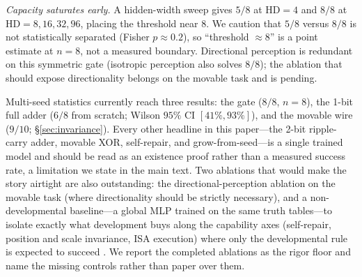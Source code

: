 \emph{Capacity saturates early.} A hidden-width sweep gives $5/8$ at HD$=4$ and $8/8$ at HD$=8,16,32,96$, placing the threshold near $8$. We caution that $5/8$ versus $8/8$ is not statistically separated (Fisher $p\approx0.2$), so ``threshold $\approx 8$'' is a point estimate at $n=8$, not a measured boundary. Directional perception is redundant on this symmetric gate (isotropic perception also solves $8/8$); the ablation that should expose directionality belongs on the movable task and is pending.

Multi-seed statistics currently reach three results: the gate ($8/8$, $n=8$), the 1-bit full adder ($6/8$ from scratch; Wilson $95\%$ CI $[41\%,93\%]$), and the movable wire ($9/10$; \S\ref{sec:invariance}). Every other headline in this paper---the 2-bit ripple-carry adder, movable XOR, self-repair, and grow-from-seed---is a single trained model and should be read as an existence proof rather than a measured success rate, a limitation we state in the main text. Two ablations that would make the story airtight are also outstanding: the directional-perception ablation on the movable task (where directionality should be strictly necessary), and a non-developmental baseline---a global MLP trained on the same truth tables---to isolate exactly what development buys along the capability axes (self-repair, position and scale invariance, ISA execution) where only the developmental rule is expected to succeed \citep{mordvintsev2020growing}. We report the completed ablations as the rigor floor and name the missing controls rather than paper over them.
